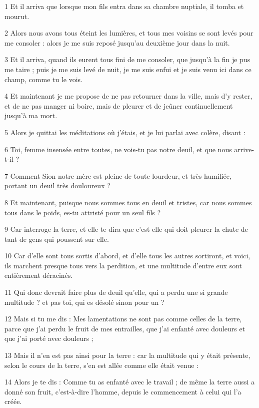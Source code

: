 
\par 1 Et il arriva que lorsque mon fils entra dans sa chambre nuptiale, il tomba et mourut.
\par 2 Alors nous avons tous éteint les lumières, et tous mes voisins se sont levés pour me consoler : alors je me suis reposé jusqu'au deuxième jour dans la nuit.
\par 3 Et il arriva, quand ils eurent tous fini de me consoler, que jusqu'à la fin je pus me taire ; puis je me suis levé de nuit, je me suis enfui et je suis venu ici dans ce champ, comme tu le vois.
\par 4 Et maintenant je me propose de ne pas retourner dans la ville, mais d'y rester, et de ne pas manger ni boire, mais de pleurer et de jeûner continuellement jusqu'à ma mort.
\par 5 Alors je quittai les méditations où j'étais, et je lui parlai avec colère, disant :
\par 6 Toi, femme insensée entre toutes, ne vois-tu pas notre deuil, et que nous arrive-t-il ?
\par 7 Comment Sion notre mère est pleine de toute lourdeur, et très humiliée, portant un deuil très douloureux ?
\par 8 Et maintenant, puisque nous sommes tous en deuil et tristes, car nous sommes tous dans le poids, es-tu attristé pour un seul fils ?
\par 9 Car interroge la terre, et elle te dira que c'est elle qui doit pleurer la chute de tant de gens qui poussent sur elle.
\par 10 Car d'elle sont tous sortis d'abord, et d'elle tous les autres sortiront, et voici, ils marchent presque tous vers la perdition, et une multitude d'entre eux sont entièrement déracinés.
\par 11 Qui donc devrait faire plus de deuil qu'elle, qui a perdu une si grande multitude ? et pas toi, qui es désolé sinon pour un ?
\par 12 Mais si tu me dis : Mes lamentations ne sont pas comme celles de la terre, parce que j'ai perdu le fruit de mes entrailles, que j'ai enfanté avec douleurs et que j'ai porté avec douleurs ;
\par 13 Mais il n'en est pas ainsi pour la terre : car la multitude qui y était présente, selon le cours de la terre, s'en est allée comme elle était venue :
\par 14 Alors je te dis : Comme tu as enfanté avec le travail ; de même la terre aussi a donné son fruit, c'est-à-dire l'homme, depuis le commencement à celui qui l'a créée.
